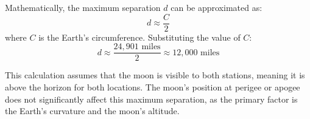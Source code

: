 Mathematically, the maximum separation \( d \) can be approximated as:
\[
d \approx \frac{C}{2}
\]
where \( C \) is the Earth's circumference. Substituting the value of \( C \):
\[
d \approx \frac{24,901 \text{ miles}}{2} \approx 12,000 \text{ miles}
\]

This calculation assumes that the moon is visible to both stations, meaning it is above the horizon for both locations. The moon's position at perigee or apogee does not significantly affect this maximum separation, as the primary factor is the Earth's curvature and the moon's altitude.


